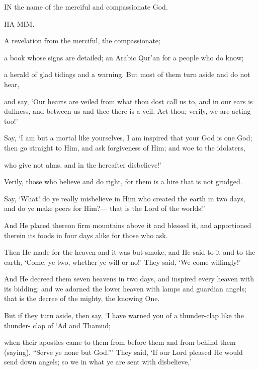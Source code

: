 \documentclass[fontsize=14pt, letterpaper, notitlepage, openany, DIV=12]{scrbook} %
\begin{document}
IN the name of the merciful and compassionate God.

\noindent[41:1]
HA MIM.

\noindent[41:2]
A revelation from the merciful, the compassionate;

\noindent[41:3]
a book whose signs are detailed; an Arabic Qur'an for a people who do know;

\noindent[41:4]
a herald of glad tidings and a warning. But most of them turn aside and do not hear,

\noindent[41:5]
and say, `Our hearts are veiled from what thou dost call us to, and in our ears is dullness,
and between us and thee there is a veil. Act thou; verily, we are acting too!'

\noindent[41:6]
Say, `I am but a mortal like yourselves, I am inspired that your God is one God; then go
straight to Him, and ask forgiveness of Him; and woe to the idolaters,

\noindent[41:7]
who give not alms, and in the hereafter disbelieve!'

\noindent[41:8]
Verily, those who believe and do right, for them is a hire that is not grudged.

\noindent[41:9]
Say, `What! do ye really misbelieve in Him who created the earth in two days, and do ye
make peers for Him?--- that is the Lord of the worlds!'

\noindent[41:10]
And He placed thereon firm mountains above it and blessed it, and apportioned therein its
foods in four days alike for those who ask.

\noindent[41:11]
Then He made for the heaven and it was but smoke, and He said to it and to the earth,
`Come, ye two, whether ye will or no!' They said, `We come willingly!'

\noindent[41:12]
And He decreed them seven heavens in two days, and inspired every heaven with its
bidding: and we adorned the lower heaven with lamps and guardian angels; that is the decree of
the mighty, the knowing One.

\noindent[41:13]
But if they turn aside, then say, `I have warned you of a thunder-clap like the thunder-
clap of `Ad and Thamud;

\noindent[41:14]
when their apostles came to them from before them and from behind them (saying),
``Serve ye none but God.''\hspace{0.1em}' They said, `If our Lord pleased He would send down angels; so we in
what ye are sent with disbelieve,'
\end{document}
